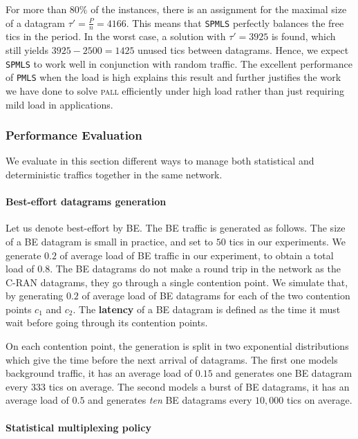 \documentclass[a4paper,10pt]{journal}
\newcommand\PMLS{\texttt{PMLS}\xspace}
\newcommand\SPMLS{\texttt{SPMLS}\xspace}
\newcommand\pall{\textsc{pall}\xspace}
\begin{document}
	For more than $80\%$ of the instances, there is an assignment for the maximal size of a datagram $\tau' = \frac{P}{n} = 4166$. This means that \SPMLS perfectly balances the free tics in the period. In the worst case, a solution with $\tau' = 3925$ is found, which still yields $3925 - 2500 = 1425$ unused tics between datagrams. Hence, we expect \SPMLS to work well in conjunction with random traffic.
	The excellent performance of \PMLS when the load is high explains this result and further justifies the work we have done to solve \pall efficiently under high load rather than just requiring mild load in applications. 


    \subsubsection{Performance Evaluation}
    
    We evaluate in this section different ways to manage both statistical and deterministic traffics together in the same network.
 
    \paragraph{Best-effort datagrams generation}
   Let us denote best-effort by BE. The BE traffic is generated as follows. The size of a BE datagram is small in practice, and set to $50$ tics in our experiments. We generate $0.2$ of average load of BE traffic in our experiment, to obtain a total load of $0.8$. The BE datagrams do not make a round trip in the network as the C-RAN datagrams, they go through a single contention point. 
    We simulate that, by generating $0.2$ of average load of BE datagrams for each of the two contention points $c_1$ and $c_2$. The \textbf{latency} of a BE datagram is defined as the time it must wait before going
    through its contention points.

    On each contention point, the generation is split in two exponential distributions which give the time before the next arrival of datagrams. The first one models background traffic, it has an average load of $0.15$ and generates one BE datagram every $333$ tics on average. The second models a burst of BE datagrams, it has an average load of $0.5$ and generates \emph{ten} BE datagrams every $10,000$ tics on average. 
    
   	\paragraph{Statistical multiplexing policy}
\end{document}
